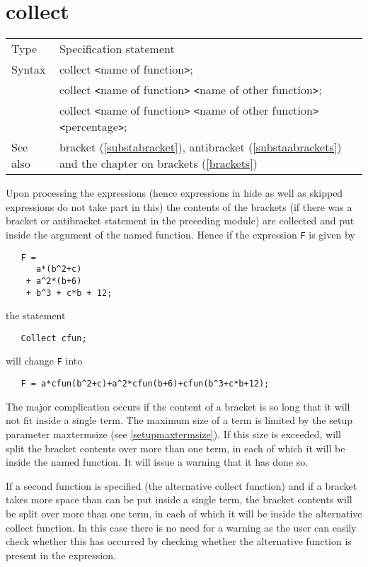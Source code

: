 
\section{collect}
\label{substacollect}

\noindent \begin{tabular}{ll}
Type & Specification statement\\
Syntax & collect {\tt<}name of function{\tt>}; \\
       & collect {\tt<}name of function{\tt>} 
        {\tt<}name of other function{\tt>}; \\
       & collect {\tt<}name of function{\tt>} 
        {\tt<}name of other function{\tt>} {\tt<}percentage{\tt>};
\\ See also & bracket (\ref{substabracket}), antibracket 
     (\ref{substaabrackets}) and the chapter on brackets 
     (\ref{brackets})
\end{tabular} \vspace{4mm}

\noindent Upon processing the expressions (hence expressions 
in hide as well as skipped expressions do not take part in this) the 
contents of the brackets (if there was a bracket or 
antibracket statement in the preceding module) are 
collected and put inside the argument of the named function. Hence if the 
expression \verb:F: is given by
\begin{verbatim}
   F =
      a*(b^2+c)
    + a^2*(b+6)
    + b^3 + c*b + 12;
\end{verbatim}
the statement
\begin{verbatim}
   Collect cfun;
\end{verbatim}
will change \verb:F: into
\begin{verbatim}
   F = a*cfun(b^2+c)+a^2*cfun(b+6)+cfun(b^3+c*b+12);
\end{verbatim}
The major complication occurs if the content of a 
bracket is so long that it will not fit inside a single term. The maximum 
size of a term is limited by the setup parameter 
maxtermsize (see \ref{setupmaxtermsize}). If this size 
is exceeded, {\FORM} will split the bracket contents over more than one term, 
in each of which it will be inside the named function. It will issue a 
warning that it has done so. \vspace{4mm}

\noindent If a second function is specified (the 
alternative collect function) and if a bracket takes 
more space than can be put inside a single term, the bracket contents will 
be split over more than one term, in each of which it will be inside the 
alternative collect function. In this case there is no need for a 
warning 
as the user can easily check whether this has occurred by checking whether 
the alternative function is present in the expression. \vspace{4mm}

